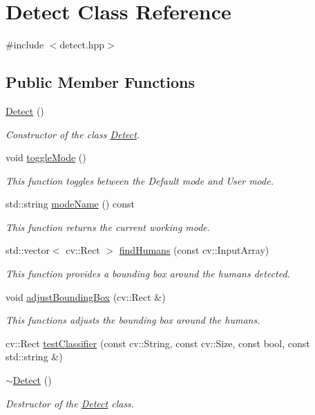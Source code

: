 \hypertarget{classDetect}{}\section{Detect Class Reference}
\label{classDetect}


{\ttfamily \#include $<$detect.\+hpp$>$}

\subsection*{Public Member Functions}
\begin{DoxyCompactItemize}
\item 
\hyperlink{classDetect_afefa427dddf8e308f93fd49424cc3680}{Detect} ()
\begin{DoxyCompactList}\small\item\em Constructor of the class \hyperlink{classDetect}{Detect}. \end{DoxyCompactList}\item 
void \hyperlink{classDetect_a75d4c27eb616460a8ba5a387620626e6}{toggle\+Mode} ()
\begin{DoxyCompactList}\small\item\em This function toggles between the Default mode and User mode. \end{DoxyCompactList}\item 
std\+::string \hyperlink{classDetect_a0742e945747fa012fb22d957a459978c}{mode\+Name} () const 
\begin{DoxyCompactList}\small\item\em This function returns the current working mode. \end{DoxyCompactList}\item 
std\+::vector$<$ cv\+::\+Rect $>$ \hyperlink{classDetect_a1d25bc00785e30f42c1f6211d11786d0}{find\+Humans} (const cv\+::\+Input\+Array)
\begin{DoxyCompactList}\small\item\em This function provides a bounding box around the humans detected. \end{DoxyCompactList}\item 
void \hyperlink{classDetect_a9b8ebb6ab8c9a07febbba30c03f55fce}{adjust\+Bounding\+Box} (cv\+::\+Rect \&)
\begin{DoxyCompactList}\small\item\em This functions adjusts the bounding box around the humans. \end{DoxyCompactList}\item 
cv\+::\+Rect \hyperlink{classDetect_aa04e736f215a89c0cd164e0465bf9f44}{test\+Classifier} (const cv\+::\+String, const cv\+::\+Size, const bool, const std\+::string \&)
\item 
\hyperlink{classDetect_aa808b1146b9b8db316b25b02f0a6b5f3}{$\sim$\+Detect} ()
\begin{DoxyCompactList}\small\item\em Destructor of the \hyperlink{classDetect}{Detect} class. \end{DoxyCompactList}\end{DoxyCompactItemize}
